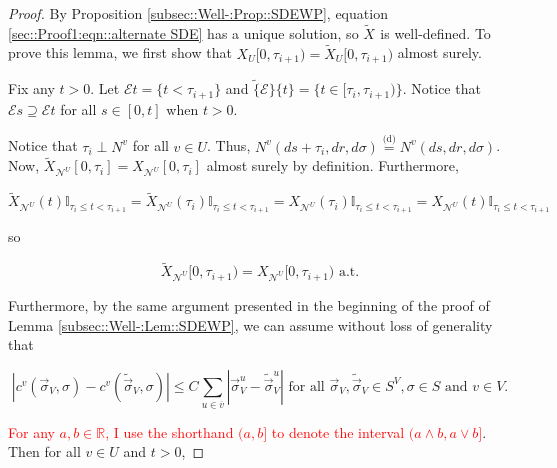 \documentclass[12pt]{article}
\newcommand{\mb}{\mathbb}
\newcommand{\mc}{\mathcal}
\newcommand{\ov}{\overline}
\newcommand{\te}{\text}
\newcommand{\tr}{\textcolor{red}}
\newcommand{\ind}{\hspace{24pt}}
\newcommand{\deq}{\overset{\text{(d)}}{=}}			%
\renewcommand{\v}{v}							%
\newcommand{\vv}{u}								%
\renewcommand{\U}{U}							%
\renewcommand{\S}{S}							%
\newcommand{\s}{\sigma}							%
\newcommand{\sv}{\vec{\s}}						%
\renewcommand{\t}{t}							%
\renewcommand{\tt}{s}							%
\newcommand{\X}{X}								%
\newcommand{\IGr}{c}							%
\newcommand{\neigh}{\mc{N}}						%
\newcommand{\vind}[1]{^{#1}}					%
\newcommand{\carp}[1]{^{#1}}					%
\newcommand{\vsi}[1]{^{#1}}						%
\newcommand{\cind}[1]{_{#1}}					%
\newcommand{\cl}{\ov}							%
\newcommand{\tp}[1]{(#1)}						%
\newcommand{\tip}[1]{#1}						%
\newcommand{\const}{C}							%
\newcommand{\poiss}{N}							%
\newcommand{\alt}[1]{\widetilde{#1}}			%
\newcommand{\indx}[1]{_{#1}}					%
\newcommand{\rt}{\tau}							%
\newcommand{\evnt}{\mc{E}}						%
\begin{document}
\begin{proof}
\ind By Proposition \ref{subsec::Well-:Prop::SDEWP}, equation \eqref{sec::Proof1:eqn::alternate SDE} has a unique solution, so \(\alt{\X}\cind{}\tip{}\) is well-defined. To prove this lemma, we first show that \(\X\cind{\U}\tip{[0,\rt\indx{i+1})} = \alt{\X}\cind{\U}\tip{}{[0,\rt\indx{i+1})}\) almost surely. 

\ind Fix any \(\t > 0\). Let \(\evnt{\t} = \{\t < \rt\indx{i+1}\}\) and \(\alt\{\evnt\}\{\t\} = \{\t\in [\rt\indx{i},\rt\indx{i+1})\}\). Notice that \(\evnt{\tt} \supseteq \evnt{\t}\) for all \(\tt\in [0,\t]\) when \(\t > 0\). 

\ind Notice that \(\rt\indx{i} \perp \poiss\vind{\v}\) for all \(\v \in \U\). Thus, \(\poiss\vind{\v}(d\tt+\rt\indx{i},dr,d\s) \deq \poiss\vind{\v}(d\tt,dr,d\s)\). Now, \(\alt{\X}\cind{\neigh\vind{\U}}\tip{[0,\rt\indx{i}]} = \X\cind{\neigh\vind{\U}}\tip{[0,\rt\indx{i}]}\) almost surely by definition. Furthermore,

\[\alt{\X}\cind{\neigh\vind{\U}}\tp{\t}\mb{I}_{\rt\indx{i}\leq \t < \rt\indx{i+1}} = \alt{\X}\cind{\neigh\vind{\U}}\tp{\rt\indx{i}}\mb{I}_{\rt\indx{i}\leq \t < \rt\indx{i+1}} = \X\cind{\neigh\vind{\U}}\tp{\rt\indx{i}}\mb{I}_{\rt\indx{i}\leq \t < \rt\indx{i+1}} = \X\cind{\neigh\vind{\U}}\tp{\t}\mb{I}_{\rt\indx{i}\leq \t < \rt\indx{i+1}}\]

so

\[\alt{\X}\cind{\neigh\vind{\U}}\tip{[0,\rt\indx{i+1})} = \X\cind{\neigh\vind{\U}}\tip{[0,\rt\indx{i+1})} \te{ a.t.}\]

Furthermore, by the same argument presented in the beginning of the proof of Lemma \ref{subsec::Well-:Lem::SDEWP}, we can assume without loss of generality that 

\[|\IGr\vind{\v}(\sv\cind{V}\vsi{},\s) - \IGr\vind{\v}(\alt{\sv}\cind{V}\vsi{},\s)| \leq \const\indx{}\sum_{\vv\in \cl{\v}} |\sv\cind{V}\vsi{\vv} - \alt{\sv}\cind{V}\vsi{\vv}|\te{ for all } \sv\cind{V}\vsi{},\alt{\sv}\cind{V}\vsi{}\in \S\carp{V},\s \in \S \te{ and } \v \in V.\]

\tr{For any \(a,b\in \mb{R}\), I use the shorthand \((a,b]\) to denote the interval \((a\wedge b,a\vee b]\)}. Then for all \(v\in \U\) and \(\t > 0\),


\end{proof}
\end{document}

